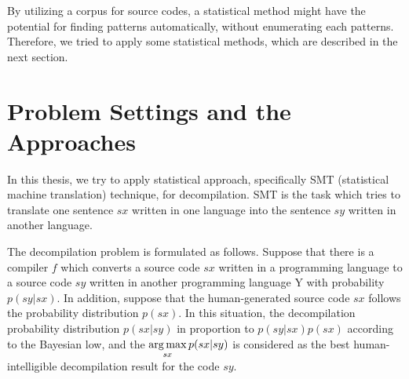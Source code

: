 \documentclass[senior,final,11pt]{iscs-thesis}
\newcommand{\argmax}{\mathop{\rm arg\,max}\limits}
\begin{document}
By utilizing a corpus for source codes, a statistical method might have the potential for finding patterns automatically, without enumerating each patterns.
Therefore, we tried to apply some statistical methods, which are described in the next section.















\section{Problem Settings and the Approaches}

In this thesis, we try to apply statistical approach, specifically SMT (statistical machine translation) technique, for decompilation.
SMT is the task which tries to translate one sentence $sx$ written in one language into the sentence $sy$ written in another language.

The decompilation problem is formulated as follows. 
Suppose that there is a compiler $ f $ which converts a source code $ sx $ written in a programming language 
to a source code $ sy $  written in another programming language Y with probability $p(sy|sx)$.
In addition, suppose that the human-generated source code $ sx $ follows the probability distribution $ p(sx) $.
In this situation, the decompilation probability distribution $ p(sx|sy) $ in proportion to $ p(sy|sx)p(sx) $ according to the Bayesian low, 
and the $\argmax_{sx} p(sx|sy)$ is considered as the best human-intelligible decompilation result for the code $sy$.
\end{document}

